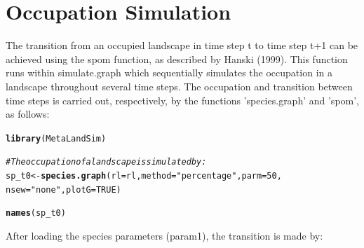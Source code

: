 \documentclass{article}\usepackage[]{graphicx}\usepackage[]{xcolor}
\makeatletter
\newcommand{\hlnum}[1]{\textcolor[rgb]{0.686,0.059,0.569}{#1}}%
\newcommand{\hlsng}[1]{\textcolor[rgb]{0.192,0.494,0.8}{#1}}%
\newcommand{\hlcom}[1]{\textcolor[rgb]{0.678,0.584,0.686}{\textit{#1}}}%
\newcommand{\hldef}[1]{\textcolor[rgb]{0.345,0.345,0.345}{#1}}%
\newcommand{\hlkwb}[1]{\textcolor[rgb]{0.69,0.353,0.396}{#1}}%
\newcommand{\hlkwc}[1]{\textcolor[rgb]{0.333,0.667,0.333}{#1}}%
\newcommand{\hlkwd}[1]{\textcolor[rgb]{0.737,0.353,0.396}{\textbf{#1}}}%
\newenvironment{kframe}{%
 \def\at@end@of@kframe{}%
 \ifinner\ifhmode%
  \def\at@end@of@kframe{\end{minipage}}%
  \begin{minipage}{\columnwidth}%
 \fi\fi%
 \def\FrameCommand##1{\hskip\@totalleftmargin \hskip-\fboxsep
 \colorbox{shadecolor}{##1}\hskip-\fboxsep
     \hskip-\linewidth \hskip-\@totalleftmargin \hskip\columnwidth}%
 \MakeFramed {\advance\hsize-\width
   \@totalleftmargin\z@ \linewidth\hsize
   \@setminipage}}%
 {\par\unskip\endMakeFramed%
 \at@end@of@kframe}
\newenvironment{knitrout}{}{} %
\makeatother
\begin{document}
\section{Occupation Simulation}
The transition from an occupied landscape in time step t to time step t+1 can be achieved using the spom function, as described by Hanski (1999). This function runs within simulate.graph which sequentially simulates the occupation in a landscape throughout several time steps. The occupation and transition between time steps is carried out, respectively, by the functions 'species.graph' and 'spom', as follows:
\begin{knitrout}
\color{fgcolor}\begin{kframe}
\begin{alltt}
\hlkwd{library}\hldef{(MetaLandSim)}
\end{alltt}


{\ttfamily\noindent\bfseries\color{errorcolor}{\#\# Error in library(MetaLandSim): there is no package called 'MetaLandSim'}}\begin{alltt}
\hlcom{#The occupation of a landscape is simulated by:}
\hldef{sp_t0} \hlkwb{<-} \hlkwd{species.graph}\hldef{(}\hlkwc{rl}\hldef{=rl,} \hlkwc{method}\hldef{=}\hlsng{"percentage"}\hldef{,} \hlkwc{parm}\hldef{=}\hlnum{50}\hldef{,}
                       \hlkwc{nsew}\hldef{=}\hlsng{"none"}\hldef{,} \hlkwc{plotG}\hldef{=}\hlnum{TRUE}\hldef{)}
\end{alltt}


{\ttfamily\noindent\bfseries{}}\begin{alltt}
\hlkwd{names}\hldef{(sp_t0)}
\end{alltt}


{\ttfamily\noindent\bfseries\color{errorcolor}{\#\# Error: object 'sp\_t0' not found}}\end{kframe}
\end{knitrout}


After loading the species parameters (param1), the transition is made by:
\end{document}
